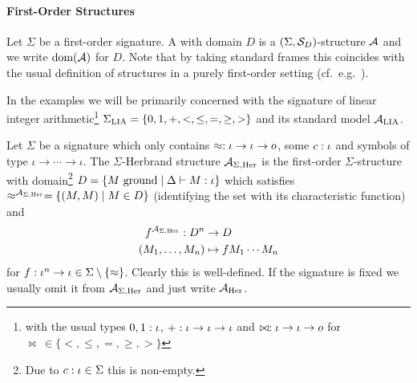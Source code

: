 \documentclass[a4paper,twoside,notitlepage,openright,11pt]{report}
\begin{document}
\paragraph{First-Order Structures}
Let $\Sigma$ be a first-order signature. A  with domain $D$ is a $(\Sigma,\mathcal S_D)$-structure $\mathcal A$ and we write $\operatorname{dom}(\mathcal A)$ for $D$. Note that by taking standard frames this coincides with the usual definition of structures in a purely first-order setting (cf.\ e.g.\ \cite{CK13}).
\begin{example}
  \label{ex:folstr}
  \begin{thmlist}
  \item In the examples we will be primarily concerned with the signature of linear integer arithmetic\footnote{with the usual types $0,1:\iota$, $+:\iota\to\iota\to\iota$ and $\bowtie:\iota\to\iota\to o$ for $\bowtie\;\in\{<,\leq,=,\geq,>\}$} $\Sigma_{\operatorname{LIA}}=\{0,1,+,<,\leq,=,\geq,>\}$ and its standard model $\mathcal A_{\operatorname{LIA}}$.
  \item Let $\Sigma$ be a signature which only contains $\approx:\iota\to\iota\to o$, some $c:\iota$ and symbols of type $\iota\to\cdots\to\iota$. The $\Sigma$-Herbrand structure $\mathcal A_{\Sigma,\operatorname{Her}}$ is the first-order $\Sigma$-structure with domain\footnote{Due to $c:\iota\in\Sigma$ this is non-empty.}
    $D=\{M\text{ ground}\mid\Delta\vdash M:\iota\}$
    which satisfies
    $\approx^{\mathcal A_{\Sigma,\operatorname{Her}}}=\{(M,M)\mid M\in D\}$ (identifying the set with its characteristic function) and
  \begin{align*}
    f^{\mathcal A_{\Sigma,\operatorname{Her}}}: D^n&\to D\\
    (M_1,\ldots,M_n)&\mapsto fM_1\cdots M_n
  \end{align*}
  for $f:\iota^n\to\iota\in\Sigma\setminus\{\approx\}$.
  Clearly this is well-defined. If the signature is fixed we usually omit it from $\mathcal A_{\Sigma,\operatorname{Her}}$ and just write $\mathcal A_{\operatorname{Her}}$.
  \end{thmlist}
\end{example}

\end{document}
